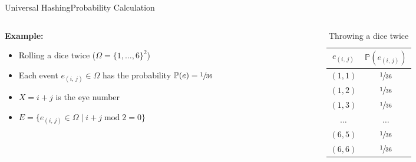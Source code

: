 \begin{frame}{Universal Hashing}{Probability Calculation}
  \begin{columns}
    \begin{column}{0.65\linewidth}
      \textbf{Example:}
      \begin{itemize}
        \item
          Rolling a dice twice ($\Omega = \{1,\dots,6\}^2$)
        \item
          Each event $e_{(i,\,j)} \in \Omega$ has the probability
          $\mathbb{P}(e) = \sfrac{1}{36}$
        \item
          $X = i + j$ is the eye number
        \item
          \begin{math}
            E = \{e_{(i,\,j)} \in \Omega
              \mid i + j \;\mathrm{mod}\; 2 = 0\}
          \end{math}
      \end{itemize}
    \end{column}
    \begin{column}{0.35\linewidth}
      \begin{table}[!h]
        \caption{Throwing a dice twice}
        \label{tab:probabilities_rolling_dice_twice}
        \begin{tabularx}{0.8\linewidth}{c|c}
          $e_{(i,\,j)}$ & $\mathbb{P}(e_{(i,\,j)})$\\
          \midrule
          $(1, 1)$ & $\sfrac{1}{36}$\\
          $(1, 2)$ & $\sfrac{1}{36}$\\
          $(1, 3)$ & $\sfrac{1}{36}$\\
          $\dots$ & $\dots$\\
          $(6, 5)$ & $\sfrac{1}{36}$\\
          $(6, 6)$ & $\sfrac{1}{36}$\\
        \end{tabularx}
      \end{table}
    \end{column}
  \end{columns}
\end{frame}


